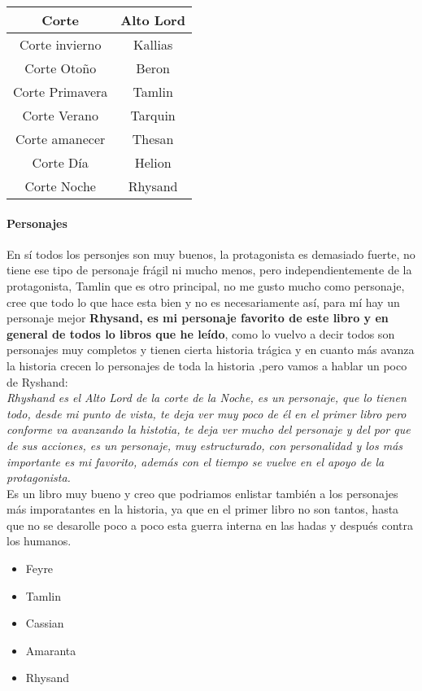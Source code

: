\documentclass[12pt]{report}
\begin{document}
\begin{tabular}{| c | c |}
  \hline
  Corte & Alto Lord \\ \hline
  Corte invierno & Kallias\\ \hline
  Corte Otoño & Beron \\ \hline
  Corte Primavera & Tamlin \\ \hline
  Corte Verano & Tarquin \\ \hline
  Corte amanecer & Thesan \\ \hline
  Corte Día & Helion \\ \hline
  Corte Noche & Rhysand \\ \hline
\end{tabular}

\paragraph{Personajes}
En sí todos los personjes son muy buenos, la protagonista es demasiado fuerte, no tiene ese tipo de personaje frágil ni mucho menos,
pero independientemente de la protagonista, Tamlin que es otro principal, no me gusto mucho como personaje, cree que todo lo que
hace esta bien  y no es necesariamente así, para mí hay un personaje mejor \textbf{Rhysand, es mi personaje favorito
  de este libro y en general de todos lo libros que he leído},
como lo vuelvo a decir todos son personajes muy completos y tienen cierta historia trágica y
en cuanto más avanza la historia crecen lo personajes de toda la historia
,pero vamos a hablar un poco de Ryshand:\\[0.2cm]

\textit{Rhyshand es el Alto Lord de la corte de la Noche, es un personaje, que lo tienen todo, desde mi punto de vista, te deja ver
muy poco de él en el primer libro pero conforme va avanzando la histotia, te deja ver mucho del personaje y del por que de sus acciones,
es un personaje, muy estructurado, con personalidad y los más importante es mi favorito, además con el tiempo se vuelve en el apoyo de la protagonista.}\\[0.2cm]

Es un libro muy bueno y creo que podriamos enlistar también a los personajes más imporatantes en la historia, ya que en el primer libro no son tantos,
hasta que no se desarolle poco a poco esta guerra interna en las hadas y después contra los humanos.

\begin{itemize}
\item Feyre
\item Tamlin
\item Cassian
\item Amaranta
\item Rhysand
\end{itemize}
\end{document}
